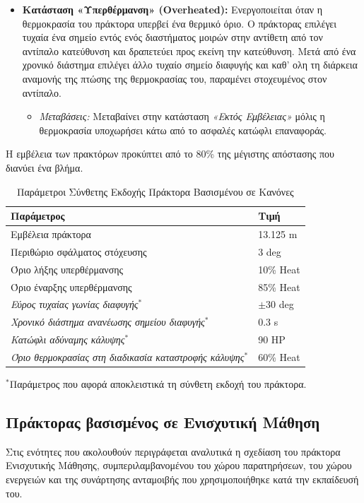 \documentclass[12pt]{article}
\begin{document}
\begin{itemize}
    \item \textbf{Κατάσταση «Υπερθέρμανση» (Overheated):} 
    Ενεργοποιείται όταν η θερμοκρασία του πράκτορα υπερβεί ένα θερμικό όριο. Ο πράκτορας επιλέγει τυχαία ένα σημείο εντός ενός διαστήματος μοιρών στην αντίθετη από τον αντίπαλο κατεύθυνση και δραπετεύει προς εκείνη την κατεύθυνση. Μετά από ένα χρονικό διάστημα επιλέγει άλλο τυχαίο σημείο διαφυγής και καθ' ολη τη διάρκεια αναμονής της πτώσης της θερμοκρασίας του, παραμένει στοχευμένος στον αντίπαλο.
    \begin{itemize}
        \item \textit{Μεταβάσεις:} Μεταβαίνει στην κατάσταση \textit{«Εκτός Εμβέλειας»} μόλις η θερμοκρασία υποχωρήσει κάτω από το ασφαλές κατώφλι επαναφοράς.
    \end{itemize}
\end{itemize}

Η εμβέλεια των πρακτόρων προκύπτει από το 80\% της μέγιστης απόστασης που διανύει ένα βλήμα. 

\begin{table}[H]
\centering
\caption{Παράμετροι Σύνθετης Εκδοχής Πράκτορα Βασισμένου σε Κανόνες}
\label{tab:complex-fsm-params}
\begin{tabular}{ll}
\hline
\textbf{Παράμετρος} & \textbf{Τιμή} \\
\hline
Εμβέλεια πράκτορα & 13.125 m \\
Περιθώριο σφάλματος στόχευσης & 3 deg \\
Όριο λήξης υπερθέρμανσης & 10\% Heat \\
Όριο έναρξης υπερθέρμανσης & 85\% Heat \\
\textit{Εύρος τυχαίας γωνίας διαφυγής}$^{*}$ & $\pm$30 deg \\
\textit{Χρονικό διάστημα ανανέωσης σημείου διαφυγής}$^{*}$ & 0.3 s \\
\textit{Κατώφλι αδύναμης κάλυψης}$^{*}$ & 90 HP \\
\textit{Όριο θερμοκρασίας στη διαδικασία καταστροφής κάλυψης}$^{*}$ & 60\% Heat \\
\hline
\end{tabular}

\vspace{4pt}
\raggedright
\footnotesize{$^{*}$Παράμετρος που αφορά αποκλειστικά τη σύνθετη εκδοχή του πράκτορα.}
\end{table}

\subsection{Πράκτορας βασισμένος σε Ενισχυτική Μάθηση}
Στις ενότητες που ακολουθούν περιγράφεται αναλυτικά η σχεδίαση του πράκτορα Ενισχυτικής Μάθησης, συμπεριλαμβανομένου του χώρου παρατηρήσεων, του χώρου ενεργειών και της συνάρτησης ανταμοιβής που χρησιμοποιήθηκε κατά την εκπαίδευσή του.
\end{document}
